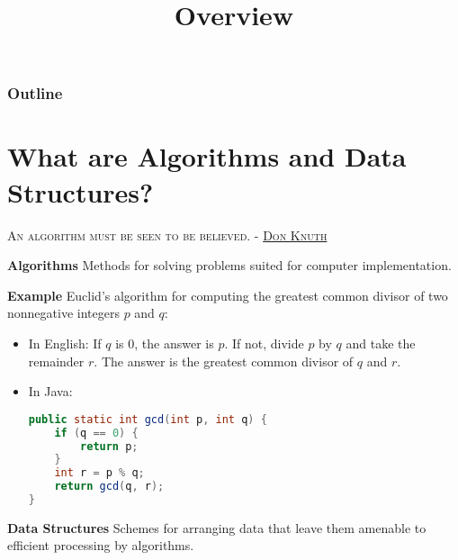 \documentclass[8pt,a4paper,compress]{beamer}
\title{Overview}
\date{}
\begin{document}
\begin{frame}
\vfill
\titlepage
\end{frame}

\begin{frame}
\frametitle{Outline}
\tableofcontents
\end{frame}

\section{What are Algorithms and Data Structures?}
\begin{frame}[fragile]
\begin{flushright}
\tiny \textsc{An algorithm must be seen to be believed. - \href{http://en.wikipedia.org/wiki/Donald_Knuth}{Don Knuth}}
\end{flushright}

\pause
\textbf{Algorithms} Methods for solving problems suited for computer implementation.

\pause
\smallskip

\textbf{Example} Euclid's algorithm for computing the greatest common divisor of two nonnegative integers $p$ and $q$: 

\begin{itemize}
\item In English: If $q$ is 0, the answer is $p$. If not, divide $p$ by $q$ and take the remainder $r$. The answer is the greatest common divisor of $q$ and $r$.
\item In Java:
\begin{lstlisting}[language=Java]
public static int gcd(int p, int q) {
    if (q == 0) {
        return p;
    }
    int r = p % q;
    return gcd(q, r);
}
\end{lstlisting}
\end{itemize}

\pause
\smallskip

\textbf{Data Structures} Schemes for arranging data that leave them amenable to efficient processing by algorithms.
\end{frame}
\end{document}
